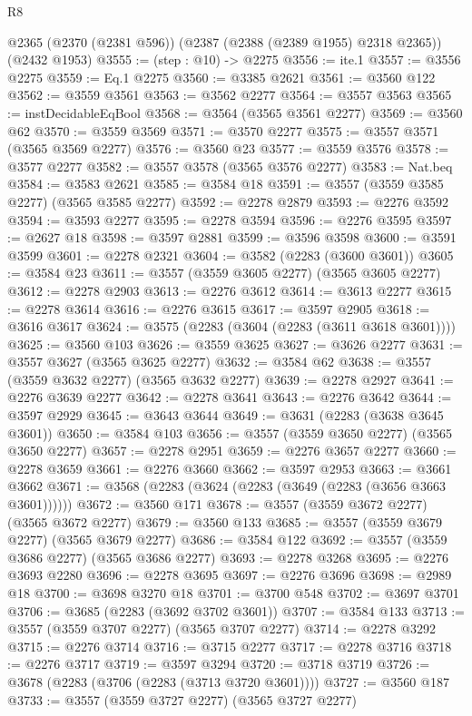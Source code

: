 \begin{lexlean}{R8}
\begin{coremodule}
    @2365
    (@2370 (@2381 @596))
    (@2387 (@2388 (@2389 @1955) @2318 @2365))
    (@2432 @1953)
@3555 := (step : @10) -> @2275
@3556 := ite.{1}
@3557 := @3556 @2275
@3559 := Eq.{1} @2275
@3560 := @3385 @2621
@3561 := @3560 @122
@3562 := @3559 @3561
@3563 := @3562 @2277
@3564 := @3557 @3563
@3565 := instDecidableEqBool
@3568 := @3564 (@3565 @3561 @2277)
@3569 := @3560 @62
@3570 := @3559 @3569
@3571 := @3570 @2277
@3575 := @3557 @3571 (@3565 @3569 @2277)
@3576 := @3560 @23
@3577 := @3559 @3576
@3578 := @3577 @2277
@3582 := @3557 @3578 (@3565 @3576 @2277)
@3583 := Nat.beq
@3584 := @3583 @2621
@3585 := @3584 @18
@3591 := @3557 (@3559 @3585 @2277) (@3565 @3585 @2277)
@3592 := @2278 @2879
@3593 := @2276 @3592
@3594 := @3593 @2277
@3595 := @2278 @3594
@3596 := @2276 @3595
@3597 := @2627 @18
@3598 := @3597 @2881
@3599 := @3596 @3598
@3600 := @3591 @3599
@3601 := @2278 @2321
@3604 := @3582 (@2283 (@3600 @3601))
@3605 := @3584 @23
@3611 := @3557 (@3559 @3605 @2277) (@3565 @3605 @2277)
@3612 := @2278 @2903
@3613 := @2276 @3612
@3614 := @3613 @2277
@3615 := @2278 @3614
@3616 := @2276 @3615
@3617 := @3597 @2905
@3618 := @3616 @3617
@3624 := @3575 (@2283 (@3604 (@2283 (@3611 @3618 @3601))))
@3625 := @3560 @103
@3626 := @3559 @3625
@3627 := @3626 @2277
@3631 := @3557 @3627 (@3565 @3625 @2277)
@3632 := @3584 @62
@3638 := @3557 (@3559 @3632 @2277) (@3565 @3632 @2277)
@3639 := @2278 @2927
@3641 := @2276 @3639 @2277
@3642 := @2278 @3641
@3643 := @2276 @3642
@3644 := @3597 @2929
@3645 := @3643 @3644
@3649 := @3631 (@2283 (@3638 @3645 @3601))
@3650 := @3584 @103
@3656 := @3557 (@3559 @3650 @2277) (@3565 @3650 @2277)
@3657 := @2278 @2951
@3659 := @2276 @3657 @2277
@3660 := @2278 @3659
@3661 := @2276 @3660
@3662 := @3597 @2953
@3663 := @3661 @3662
@3671 := @3568 (@2283 (@3624 (@2283 (@3649 (@2283 (@3656 @3663 @3601))))))
@3672 := @3560 @171
@3678 := @3557 (@3559 @3672 @2277) (@3565 @3672 @2277)
@3679 := @3560 @133
@3685 := @3557 (@3559 @3679 @2277) (@3565 @3679 @2277)
@3686 := @3584 @122
@3692 := @3557 (@3559 @3686 @2277) (@3565 @3686 @2277)
@3693 := @2278 @3268
@3695 := @2276 @3693 @2280
@3696 := @2278 @3695
@3697 := @2276 @3696
@3698 := @2989 @18
@3700 := @3698 @3270 @18
@3701 := @3700 @548
@3702 := @3697 @3701
@3706 := @3685 (@2283 (@3692 @3702 @3601))
@3707 := @3584 @133
@3713 := @3557 (@3559 @3707 @2277) (@3565 @3707 @2277)
@3714 := @2278 @3292
@3715 := @2276 @3714
@3716 := @3715 @2277
@3717 := @2278 @3716
@3718 := @2276 @3717
@3719 := @3597 @3294
@3720 := @3718 @3719
@3726 := @3678 (@2283 (@3706 (@2283 (@3713 @3720 @3601))))
@3727 := @3560 @187
@3733 := @3557 (@3559 @3727 @2277) (@3565 @3727 @2277)

\end{coremodule}
\end{lexlean}
